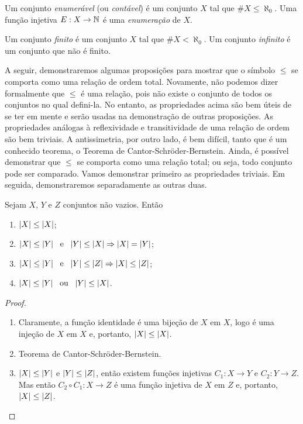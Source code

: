 \begin{defi}
	Um conjunto \emph{enumerável} (ou \emph{contável}) é um conjunto $X$ tal que $\# X \leq \aleph_0$. Uma função injetiva $E: X \to \mathbb{N}$ é uma \emph{enumeração} de $X$.
\end{defi}

\begin{defi}
	Um conjunto \emph{finito} é um conjunto $X$ tal que $\# X < \aleph_0$. Um conjunto \emph{infinito} é um conjunto que não é finito.
\end{defi}
	
	A seguir, demonstraremos algumas proposições para mostrar que o símbolo $\leq$ se comporta como uma relação de ordem total. Novamente, não podemos dizer formalmente que $\leq$ é uma relação, pois não existe o conjunto de todos os conjuntos no qual defini-la. No entanto, as propriedades acima são bem úteis de se ter em mente e serão usadas na demonstração de outras proposições. As propriedades análogas à reflexividade e transitividade de uma relação de ordem são bem triviais. A antissimetria, por outro lado, é bem difícil, tanto que é um conhecido teorema, o Teorema de Cantor-Schröder-Bernstein. Ainda, é possível demonstrar que $\leq$ se comporta como uma relação total; ou seja, todo conjunto pode ser comparado. Vamos demonstrar primeiro as propriedades triviais. Em seguida, demonstraremos separadamente as outras duas.

\begin{prop}
	Sejam $X$, $Y$ e $Z$ conjuntos não vazios. Então
	\begin{enumerate}
	\item $\left\vert{X}\right\vert \leq \left\vert{X}\right\vert$;
	\item $\left\vert{X}\right\vert \leq \left\vert{Y}\right\vert \text{\ \ e\ \ }  \left\vert{Y}\right\vert \leq \left\vert{X}\right\vert \Rightarrow \left\vert{X}\right\vert = \left\vert{Y}\right\vert$;
	\item $\left\vert{X}\right\vert \leq \left\vert{Y}\right\vert \text{\ \ e\ \ } \left\vert{Y}\right\vert \leq \left\vert{Z}\right\vert \Rightarrow \left\vert{X}\right\vert \leq \left\vert{Z}\right\vert$;
	\item $\left\vert{X}\right\vert \leq \left\vert{Y}\right\vert \text{\ \ ou\ \ } \left\vert{Y}\right\vert \leq \left\vert{X}\right\vert$.
	\end{enumerate}
\end{prop}
\begin{proof}
	\begin{enumerate}
	\item Claramente, a função identidade é uma bijeção de $X$ em $X$, logo é uma injeção de $X$ em $X$ e, portanto, $\left\vert{X}\right\vert \leq \left\vert{X}\right\vert$.
	\item Teorema de Cantor-Schröder-Bernstein.
	\item $\left\vert{X}\right\vert \leq \left\vert{Y}\right\vert$ e $\left\vert{Y}\right\vert \leq \left\vert{Z}\right\vert$, então existem funções injetivas $C_1:X \to Y$ e $C_2: Y \to Z$. Mas então $C_2 \circ C_1: X \to Z$ é uma função injetiva de $X$ em $Z$ e, portanto, $\left\vert{X}\right\vert \leq \left\vert{Z}\right\vert$.
	\end{enumerate}
\end{proof}


